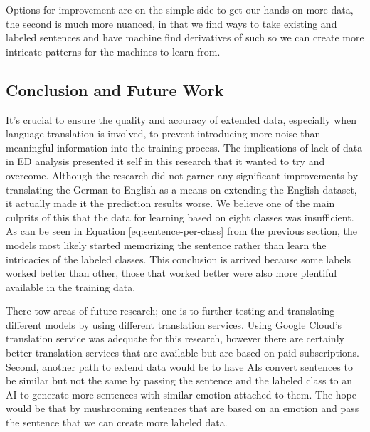 \documentclass[11pt]{article}
\begin{document}
Options for improvement are on the simple side to get our hands on more data, the second is much more nuanced, in that we find ways to take existing and labeled sentences and have machine find derivatives of such so we can create more intricate patterns for the machines to learn from.

\subsection{Conclusion and Future Work}
It's crucial to ensure the quality and accuracy of extended data, especially when language translation is involved, to prevent introducing more noise than meaningful information into the training process. The implications of lack of data in ED analysis presented it self in this research that it wanted to try and overcome. Although the research did not garner any significant improvements by translating the German to English as a means on extending the English dataset, it actually made it the prediction results worse. We believe one of the main culprits of this that the data for learning based on eight classes was insufficient. As can be seen in Equation \ref{eq:sentence-per-class} from the previous section, the models most likely started memorizing the sentence rather than learn the intricacies of the labeled classes. This conclusion is arrived because some labels worked better than other, those that worked better were also more plentiful available in the training data.

There tow areas of future research; one is to further testing and translating different models by using different translation services. Using Google Cloud's translation service was adequate for this research, however there are certainly better translation services that are available but are based on paid subscriptions. Second, another path to extend data would be to have AIs convert sentences to be similar but not the same by passing the sentence and the labeled class to an AI to generate more sentences with similar emotion attached to them. The hope would be that by mushrooming sentences that are based on an emotion and pass the sentence that we can create more labeled data.

\clearpage
{}
\printbibliography
\clearpage


\listoffigures
\clearpage


\appendix
\end{document}
